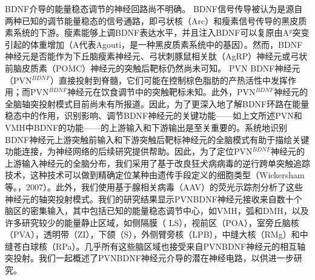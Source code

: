 BDNF介导的能量稳态调节的神经回路尚不明确。 BDNF信号传导被认为是源自两种已知的调节能量稳态的信号通路\citep{waterson2015neuronal, krashes2016melanocortin}，即弓状核（Arc）\citep{xu2003brain}和瘦素信号传导\citep{liao2012dendritically}的黑皮质素系统的下游。瘦素能够上调BDNF表达水平，并且注入BDNF可以复原由A$^{y}$突变引起的体重增加（A代表Agouti，是一种黑皮质素系统中的基因）。然而，BDNF神经元是否能作为下丘脑瘦素神经元、弓状刺豚鼠相关肽（AgRP）神经元或弓状前脑皮质素（POMC）神经元的突触后靶标仍然尚未可知。 PVN BDNF神经元（PVN$^{BDNF}$）直接投射到脊髓，它们可能在控制棕色脂肪的产热活性中发挥作用；而PVN$^{BDNF}$神经元在饮食调节中的突触靶标未知\citep{an2015discrete}。此外，PVN$^{BDNF}$神经元的全脑轴突投射模式目前尚未有所报道。因此，为了更深入地了解BDNF环路在能量稳态中的作用，识别影响、调节BDNF神经元的关键功能——如上文所述PVN和VMH中BDNF的功能——的上游输入和下游输出是至关重要的。系统地识别BDNF神经元上游突触前输入和下游突触后靶标神经元的全脑模式有助于描绘关键功能连接，为神经网络的后续研究提供帮助。因此，为了定位PVN$^{BDNF}$神经元的上游输入神经元的全脑分布，我们采用了基于改良狂犬病病毒的逆行跨单突触追踪技术，这种技术可以做到精确定位某种由遗传手段定义的细胞类型（Wickersham等。，2007）。此外，我们使用基于腺相关病毒（AAV）的荧光示踪剂分析了这些神经元的轴突投射模式。我们的研究结果显示PVNBDNF神经元接收来自数十个脑区的密集输入，其中包括已知的能量稳态调节中心，如VMH，弧和DMH，以及许多研究较少的能量静止区域，如侧隔膜（ LS），视前区（POA），室旁丘脑核（PVA），透明带（ZI），下颌（S），外侧臂旁核（LPB），中缝大核（RMg）和中缝苍白球核（RPa）。几乎所有这些脑区域也接受来自PVNBDNF神经元的相互轴突投射。我们一起概述了PVNBDNF神经元介导的潜在神经电路，以供进一步研究。
